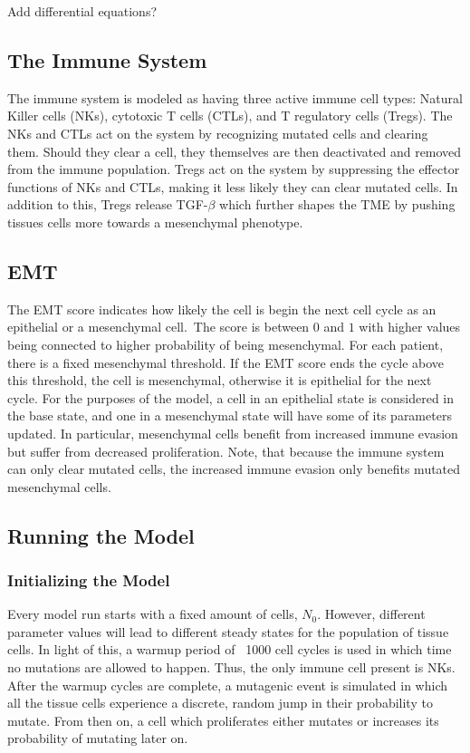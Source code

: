 \documentclass{article}
\begin{document}
Add differential equations? %
\subsection{The Immune System}\label{ImmuneSystem}
The immune system is modeled as having three active immune cell types: Natural Killer cells (NKs), cytotoxic T cells (CTLs), and T regulatory cells (Tregs).
The NKs and CTLs act on the system by recognizing mutated cells and clearing them.
Should they clear a cell, they themselves are then deactivated and removed from the immune population.
Tregs act on the system by suppressing the effector functions of NKs and CTLs, making it less likely they can clear mutated cells.
In addition to this, Tregs release TGF-$\beta$ which further shapes the TME by pushing tissues cells more towards a mesenchymal phenotype.

\subsection{EMT}\label{EMT}
The EMT score indicates how likely the cell is begin the next cell cycle as an epithelial or a mesenchymal cell.\
The score is between $0$ and $1$ with higher values being connected to higher probability of being mesenchymal.
For each patient, there is a fixed mesenchymal threshold.
If the EMT score ends the cycle above this threshold, the cell is mesenchymal, otherwise it is epithelial for the next cycle.
For the purposes of the model, a cell in an epithelial state is considered in the base state, and one in a mesenchymal state will have some of its parameters updated.
In particular, mesenchymal cells benefit from increased immune evasion but suffer from decreased proliferation.
Note, that because the immune system can only clear mutated cells, the increased immune evasion only benefits mutated mesenchymal cells.

\subsection{Running the Model}

\subsubsection{Initializing the Model}
Every model run starts with a fixed amount of cells, $N_0$.
However, different parameter values will lead to different steady states for the population of tissue cells.
In light of this, a warmup period of ~1000 cell cycles is used in which time no mutations are allowed to happen.
Thus, the only immune cell present is NKs.
After the warmup cycles are complete, a mutagenic event is simulated in which all the tissue cells experience a discrete, random jump in their probability to mutate.
From then on, a cell which proliferates either mutates or increases its probability of mutating later on.
\end{document}
